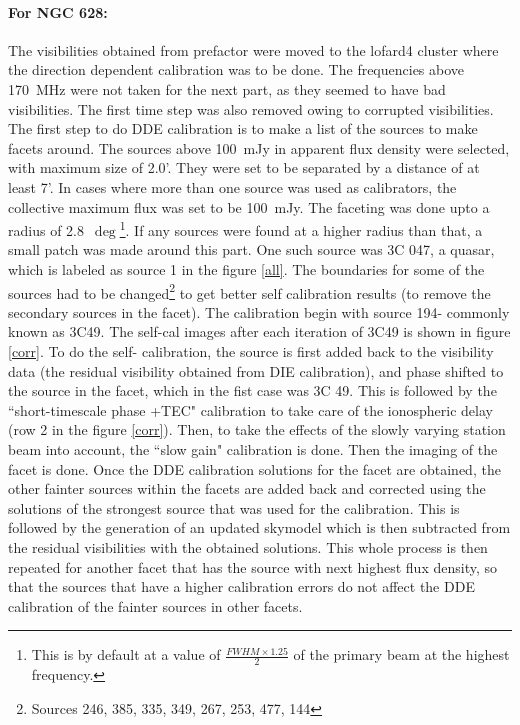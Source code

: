 \documentclass[../main/thesis_msc.tex]{subfiles}
\begin{document}
\paragraph{For NGC 628:} The visibilities obtained from prefactor were moved to the lofard4 cluster where the direction dependent calibration was to be done. The frequencies above 170~MHz were not taken for the next part, as they seemed to have bad visibilities. The first time step was also removed owing to corrupted visibilities. The first step to do DDE calibration is to make a list of the sources to make facets around. The sources above 100~mJy in apparent flux density were selected, with maximum size of 2.0'. They were set to be separated by a distance of at least 7'. In cases where more than one source was used as calibrators, the collective maximum flux was set to be 100~mJy. The faceting was done upto a radius of 2.8~$\deg$\footnote{This is by default at a value of $\frac{FWHM \times 1.25}{2}$ of the primary beam at the highest frequency.}. If any sources were found at a higher radius than that, a small patch was made around this part. One such source was 3C 047, a quasar, which is labeled as source 1 in the figure \ref{all}. The boundaries for some of the sources had to be changed\footnote{Sources 246, 385, 335, 349, 267, 253, 477, 144} to get better self calibration results (to remove the secondary sources in the facet). The calibration begin with source 194- commonly known as 3C49. The self-cal images after each iteration of 3C49 is shown in figure \ref{corr}. To do the self- calibration, the source is first added back to the visibility data (the residual visibility obtained from DIE calibration), and phase shifted to the source in the facet, which in the fist case was 3C 49. This is followed by the ``short-timescale phase +TEC" calibration to take care of the ionospheric delay (row 2 in the figure \ref{corr}). Then, to take the effects of the slowly varying station beam into account, the ``slow gain" calibration is done. Then the imaging of the facet is done. Once the DDE calibration solutions for the facet are obtained, the other fainter sources within the facets are added back and corrected using the solutions of the strongest source that was used for the calibration. This is followed by the generation of an updated skymodel which is then subtracted from the residual visibilities with the obtained solutions. This whole process is then repeated for another facet that has the source with next highest flux density, so that the sources that have a higher calibration errors do not affect the DDE calibration of the fainter sources in other facets.\\
\end{document}

